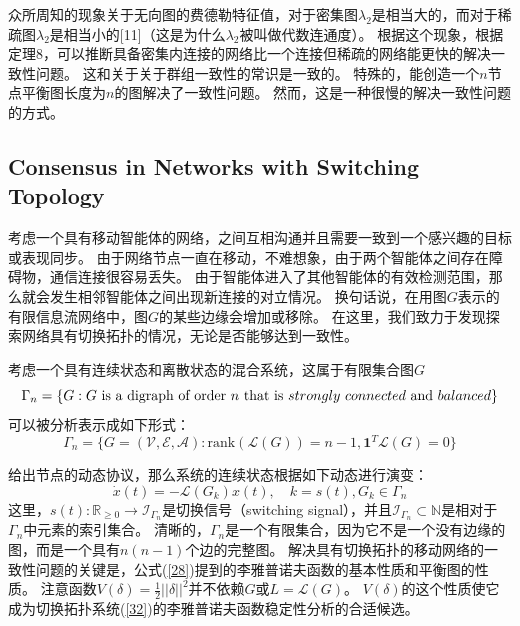 \documentclass{article}
\begin{document}
众所周知的现象关于无向图的费德勒特征值，对于密集图$\lambda_2$是相当大的，而对于稀疏图$\lambda_2$是相当小的[11]（这是为什么$\lambda_2$被叫做代数连通度）。
根据这个现象，根据定理8，可以推断具备密集内连接的网络比一个连接但稀疏的网络能更快的解决一致性问题。
这和关于关于群组一致性的常识是一致的。
特殊的，能创造一个$n$节点平衡图长度为$n$的图解决了一致性问题。
然而，这是一种很慢的解决一致性问题的方式。


\subsection{Consensus in Networks with Switching Topology}
考虑一个具有移动智能体的网络，之间互相沟通并且需要一致到一个感兴趣的目标或表现同步。
由于网络节点一直在移动，不难想象，由于两个智能体之间存在障碍物，通信连接很容易丢失。
由于智能体进入了其他智能体的有效检测范围，那么就会发生相邻智能体之间出现新连接的对立情况。
换句话说，在用图$G$表示的有限信息流网络中，图$G$的某些边缘会增加或移除。
在这里，我们致力于发现探索网络具有切换拓扑的情况，无论是否能够达到一致性。

考虑一个具有连续状态和离散状态的混合系统，这属于有限集合图$G$
\begin{equation}
    \Gamma_n = \{ G: G\ \text{is a digraph of order}\ n\ \text{that is}\ strongly\ connected\ \text{and}\ balanced \}
    \notag
\end{equation}
可以被分析表示成如下形式：
\begin{equation}
    \Gamma_n = \{ G=(\mathcal{V}, \mathcal{E}, \mathcal{A}): \text{rank}(\mathcal{L}(G)) =n-1, \mathbf{1}^T\mathcal{L}(G) = 0\}
    \tag{31}
    \label{31}
\end{equation}

给出节点的动态协议，那么系统的连续状态根据如下动态进行演变：
\begin{equation}
    \dot{x}(t) = -\mathcal{L}(G_k)x(t),\quad k=s(t), G_k\in \Gamma_n
    \tag{32}
    \label{32}
\end{equation}
这里，$s(t): \mathbb{R}_{\ge 0}\rightarrow \mathcal{I}_{\Gamma_n}$是切换信号（switching signal），并且$\mathcal{I}_{\Gamma_n}\subset \mathbb{N}$是相对于$\Gamma_n$中元素的索引集合。
清晰的，$\Gamma_n$是一个有限集合，因为它不是一个没有边缘的图，而是一个具有$n(n-1)$个边的完整图。
解决具有切换拓扑的移动网络的一致性问题的关键是，公式(\ref{28})提到的李雅普诺夫函数的基本性质和平衡图的性质。
注意函数$V(\delta)=\frac{1}{2}||\delta||^2$并不依赖$G$或$L=\mathcal{L}(G)$。
$V(\delta)$的这个性质使它成为切换拓扑系统(\ref{32})的李雅普诺夫函数稳定性分析的合适候选。
\end{document}
